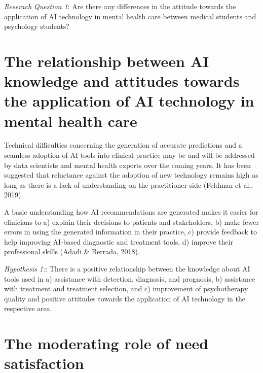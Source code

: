 \documentclass[
  man]{apa7}
\begin{document}
\emph{Reserach Question 1}: Are there any differences in the attitude towards the application of AI technology in mental health care between medical students and psychology students?

\hypertarget{the-relationship-between-ai-knowledge-and-attitudes-towards-the-application-of-ai-technology-in-mental-health-care}{%
\section{The relationship between AI knowledge and attitudes towards the application of AI technology in mental health care}\label{the-relationship-between-ai-knowledge-and-attitudes-towards-the-application-of-ai-technology-in-mental-health-care}}

Technical difficulties concerning the generation of accurate predictions and a seamless adoption of AI tools into clinical practice may be and will be addressed by data scientists and mental health experts over the coming years.
It has been suggested that reluctance against the adoption of new technology remains high as long as there is a lack of understanding on the practitioner side (Feldman et al., 2019).

A basic understanding how AI recommendations are generated makes it easier for clinicians to a) explain their decisions to patients and stakeholders, b) make fewer errors in using the generated information in their practice, c) provide feedback to help improving AI-based diagnostic and treatment tools, d) improve their professional skills (Adadi \& Berrada, 2018).

\emph{Hypothesis 1:}: There is a positive relationship between the knowledge about AI tools used in a) assistance with detection, diagnosis, and prognosis, b) assistance with treatment and treatment selection, and c) improvement of psychotherapy quality and positive attitudes towards the application of AI technology in the respective area.

\hypertarget{the-moderating-role-of-need-satisfaction}{%
\section{The moderating role of need satisfaction}\label{the-moderating-role-of-need-satisfaction}}
\end{document}
